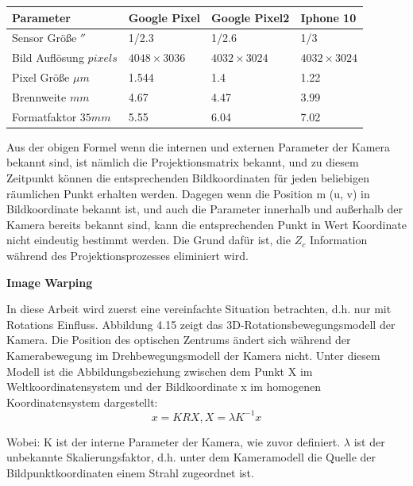 \begin{table}[htb]
	\label{tbl:params}
	\footnotesize
	\centering
	\begin{tabular}{|p{3cm}|p{2.5cm}|p{2.5cm}|p{2.5cm}|}	%
	\toprule
	\textbf{Parameter} & \textbf{Google Pixel} & \textbf{Google Pixel2} & \textbf{Iphone 10}\\
	\midrule
	Sensor Größe $''$ & 1/2.3 & 1/2.6 & 1/3 \\
	Bild Auflösung $pixels$ & $4048 \times 3036$ & $4032 \times 3024$ & $4032 \times 3024$ \\
	Pixel Größe $\mu m$ & 1.544 & 1.4 & 1.22 \\	
	Brennweite $mm$ & 4.67 & 4.47 & 3.99 \\
	Formatfaktor $35 mm$  	&5.55	&6.04	&7.02	\\
	
	\bottomrule
	\end{tabular}
\end{table} 


Aus der obigen Formel wenn die internen und externen Parameter der Kamera bekannt sind, ist nämlich die Projektionsmatrix bekannt, und zu diesem Zeitpunkt können die entsprechenden Bildkoordinaten für jeden beliebigen räumlichen Punkt erhalten werden. Dagegen  wenn die Position m (u, v) in Bildkoordinate bekannt ist, und auch die Parameter innerhalb und außerhalb der Kamera bereits bekannt sind, kann die entsprechenden Punkt in Wert Koordinate nicht eindeutig bestimmt werden. Die Grund dafür ist, die $Z_c$ Information während des Projektionsprozesses eliminiert wird. 

\textbf{Image Warping}

In diese Arbeit wird zuerst eine vereinfachte Situation  betrachten, d.h. nur mit Rotations Einfluss. Abbildung 4.15 zeigt das 3D-Rotationsbewegungsmodell der Kamera. Die Position des optischen Zentrums ändert sich während der Kamerabewegung im Drehbewegungsmodell der Kamera nicht. Unter diesem Modell ist die Abbildungsbeziehung zwischen dem Punkt X im Weltkoordinatensystem und der Bildkoordinate x im homogenen Koordinatensystem dargestellt: 
\begin{equation}
   x = KRX, X = \lambda  K^{-1} x
\end{equation}

Wobei: K ist der interne Parameter der Kamera, wie zuvor definiert. $\lambda$ ist der unbekannte Skalierungsfaktor, d.h. unter dem Kameramodell die Quelle der Bildpunktkoordinaten einem Strahl zugeordnet ist.

